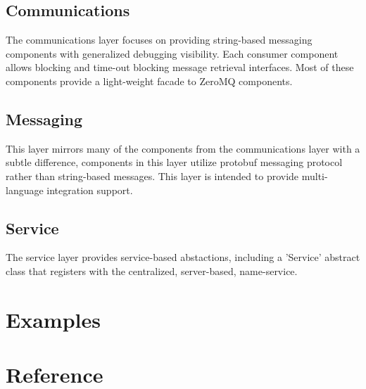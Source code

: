 \documentclass[fontsize=12pt]{book}
\newcommand{\insertPython}[1]{ 
\begin{tcolorbox}[title=#1,coltitle=lightgray,width=6in]

\end{tcolorbox}
}
\begin{document}
\section{Communications}
The communications layer focuses on providing string-based messaging components with generalized debugging visibility.  Each consumer component allows blocking and time-out blocking message retrieval interfaces.  Most of these components provide a light-weight facade to ZeroMQ components.

\section{Messaging}
This layer mirrors many of the components from the communications layer with a subtle difference, components in this layer utilize protobuf messaging protocol rather than string-based messages.  This layer is intended to provide multi-language integration support.

\section{Service}
The service layer provides service-based abstactions, including a 'Service' abstract class that registers with the centralized, server-based, name-service.

\chapter{Examples}
\insertPython{simplePubSub.py}
\insertPython{msgReactor.py}

\chapter{Reference}

\end{document}
